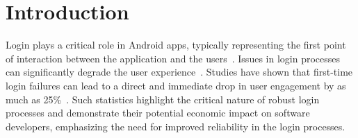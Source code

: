 \section{Introduction}
Login plays a critical role in Android apps, typically representing the first point of interaction between the application and the users~\cite{Alsanousi2023}.
Issues in login processes can significantly degrade the user experience~\cite{FTUE,5reasonsfailuser,Mobileappusage,9042272}.
Studies have shown that first-time login failures can lead to a direct and immediate drop in user engagement by as much as 25\%~\cite{FTUE,10679403}. Such statistics highlight the critical nature of robust login processes and demonstrate their potential economic impact on software developers, emphasizing the need for improved reliability in the login processes.




